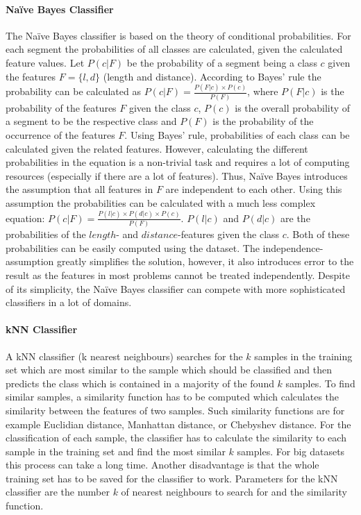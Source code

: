   


\paragraph{Naïve Bayes Classifier}

The Naïve Bayes classifier is based on the theory of conditional probabilities. For each segment the probabilities of all classes are calculated, given the calculated feature values. Let $P(c|F)$ be the probability of a segment being a class $c$ given the features $F = \{l, d\}$ (length and distance). According to Bayes' rule the probability can be calculated as $P(c|F) = \frac{P(F|c) \times P(c)}{P(F)}$, where $P(F|c)$ is the probability of the features $F$ given the class $c$, $P(c)$ is the overall probability of a segment to be the respective class and $P(F)$ is the probability of the occurrence of the features $F$. Using Bayes' rule, probabilities of each class can be calculated given the related features. However, calculating the different probabilities in the equation is a non-trivial task and requires a lot of computing resources (especially if there are a lot of features). Thus, Naïve Bayes introduces the assumption that all features in $F$ are independent to each other. Using this assumption the probabilities can be calculated with a much less complex equation: $P(c|F) = \frac{P(l|c) \times P(d|c) \times P(c)}{P(F)}$. $P(l|c)$ and $P(d|c)$ are the probabilities of the $length$- and $distance$-features given the class $c$. Both of these probabilities can be easily computed using the dataset. The independence-assumption greatly simplifies the solution, however, it also introduces error to the result as the features in most problems cannot be treated independently. Despite of its simplicity, the Naïve Bayes classifier can compete with more sophisticated classifiers in a lot of domains.



\paragraph{kNN Classifier}

A kNN classifier (k nearest neighbours) searches for the $k$ samples in the training set which are most similar to the sample which should be classified and then predicts the class which is contained in a majority of the found $k$ samples. To find similar samples, a similarity function has to be computed which calculates the similarity between the features of two samples. Such similarity functions are for example Euclidian distance, Manhattan distance, or Chebyshev distance. For the classification of each sample, the classifier has to calculate the similarity to each sample in the training set and find the most similar $k$ samples. For big datasets this process can take a long time. Another disadvantage is that the whole training set has to be saved for the classifier to work. Parameters for the kNN classifier are the number $k$ of nearest neighbours to search for and the similarity function.



